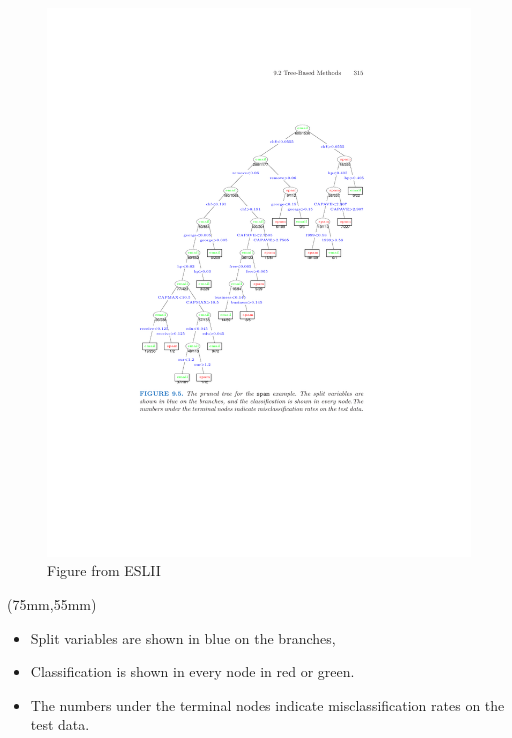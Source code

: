 \documentclass[mathserif, aspectratio=169]{beamer}
\begin{document}
\begin{frame}{}
\begin{figure}
\includegraphics[height=0.93\textheight]{spam_tree}
\caption*{ Figure from ESLII}
\end{figure}


\begin{textblock*}{50mm}(75mm,55mm)
\begin{exampleblock}{}
\scriptsize
\begin{itemize}
\item Split variables are shown in blue on the branches, 

\item Classification is shown in every node in red or green.

\item The numbers under the terminal nodes indicate misclassification rates on the test data.
\end{itemize}

\end{exampleblock}
\end{textblock*}

\end{frame}
\end{document}
